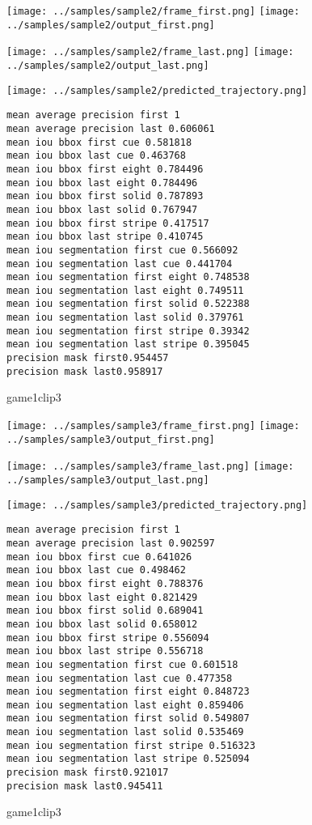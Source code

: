 \begin{figure}
\texttt{[image: ../samples/sample2/frame\_first.png]}
\texttt{[image: ../samples/sample2/output\_first.png]}\par
\texttt{[image: ../samples/sample2/frame\_last.png]}
\texttt{[image: ../samples/sample2/output\_last.png]}\par
\texttt{[image: ../samples/sample2/predicted\_trajectory.png]}
\caption{game1clip3}
\begin{verbatim}
mean average precision first 1
mean average precision last 0.606061
mean iou bbox first cue 0.581818
mean iou bbox last cue 0.463768
mean iou bbox first eight 0.784496
mean iou bbox last eight 0.784496
mean iou bbox first solid 0.787893
mean iou bbox last solid 0.767947
mean iou bbox first stripe 0.417517
mean iou bbox last stripe 0.410745
mean iou segmentation first cue 0.566092
mean iou segmentation last cue 0.441704
mean iou segmentation first eight 0.748538
mean iou segmentation last eight 0.749511
mean iou segmentation first solid 0.522388
mean iou segmentation last solid 0.379761
mean iou segmentation first stripe 0.39342
mean iou segmentation last stripe 0.395045
precision mask first0.954457
precision mask last0.958917
\end{verbatim}

\end{figure}

\begin{figure}
\texttt{[image: ../samples/sample3/frame\_first.png]}
\texttt{[image: ../samples/sample3/output\_first.png]}\par
\texttt{[image: ../samples/sample3/frame\_last.png]}
\texttt{[image: ../samples/sample3/output\_last.png]}\par
\texttt{[image: ../samples/sample3/predicted\_trajectory.png]}
\caption{game1clip3}
\begin{verbatim}
mean average precision first 1
mean average precision last 0.902597
mean iou bbox first cue 0.641026
mean iou bbox last cue 0.498462
mean iou bbox first eight 0.788376
mean iou bbox last eight 0.821429
mean iou bbox first solid 0.689041
mean iou bbox last solid 0.658012
mean iou bbox first stripe 0.556094
mean iou bbox last stripe 0.556718
mean iou segmentation first cue 0.601518
mean iou segmentation last cue 0.477358
mean iou segmentation first eight 0.848723
mean iou segmentation last eight 0.859406
mean iou segmentation first solid 0.549807
mean iou segmentation last solid 0.535469
mean iou segmentation first stripe 0.516323
mean iou segmentation last stripe 0.525094
precision mask first0.921017
precision mask last0.945411
\end{verbatim}
\end{figure}

